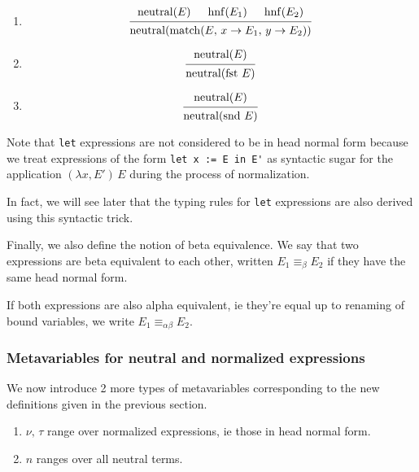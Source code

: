 \documentclass{article}
\begin{document}
\begin{definition} 
\begin{enumerate}
  \item \[
    \begin{prooftree}
      \hypo{\neutral(E)} 
      \hypo{\hnf(E_1)} 
      \hypo{\hnf(E_2)} 
      \infer3{\neutral(\match(E, \, x \rightarrow E_1, \, y \rightarrow E_2))}
    \end{prooftree}
  \]

  \item \[
    \begin{prooftree}
      \hypo{\neutral(E)} 
      \infer1{\neutral(\fst \, E)}
    \end{prooftree}
  \]

  \item \[
    \begin{prooftree}
      \hypo{\neutral(E)} 
      \infer1{\neutral(\snd \, E)}
    \end{prooftree}
  \]
\end{enumerate}
\end{definition}

Note that \verb|let| expressions are not considered to be in head normal form
because we treat expressions of the form \verb|let x := E in E'| as syntactic
sugar for the application $(\lambda x, E') \, E$ during the process of
normalization. 

In fact, we will see later that the typing rules for \verb|let|
expressions are also derived using this syntactic trick. 

\begin{definition} 
Finally, we also define the notion of beta equivalence. We say that two expressions
are beta equivalent to each other, written $E_1 \equiv_\beta E_2$ if they have
the same head normal form.

If both expressions are also alpha equivalent, ie
they're equal up to renaming of bound variables, we write
$E_1 \equiv_{\alpha \beta} E_2$.
\end{definition}

\subsubsection{Metavariables for neutral and normalized expressions}
We now introduce 2 more types of metavariables corresponding to the new definitions
given in the previous section. 

\begin{enumerate}
\item $\nu, \, \tau$ range over normalized expressions, ie those in head normal
form.
\item $n$ ranges over all neutral terms.
\end{enumerate}
\end{document}
